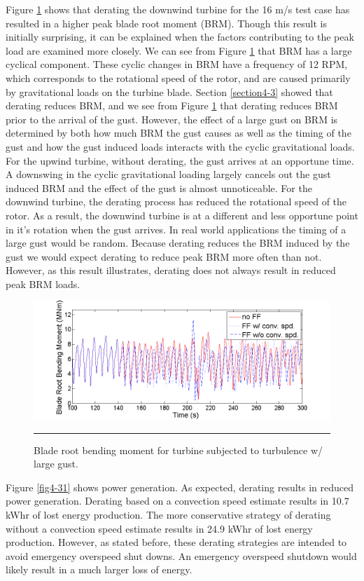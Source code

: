 Figure \ref{fig4-30} shows that derating the downwind turbine for the 16 m/s test case has resulted in a higher peak blade root moment (BRM). Though this result is initially surprising, it can be explained when the factors contributing to the peak load are examined more closely. We can see from Figure \ref{fig4-30} that BRM has a large cyclical component. These cyclic changes in BRM have a frequency of 12 RPM, which corresponds to the rotational speed of the rotor, and are caused primarily by gravitational loads on the turbine blade. Section \ref{section4-3} showed that derating reduces BRM, and we see from Figure \ref{fig4-30} that derating reduces BRM prior to the arrival of the gust. However, the effect of a large gust on BRM is determined by both how much BRM the gust causes as well as the timing of the gust and how the gust induced loads interacts with the cyclic gravitational loads. For the upwind turbine, without derating, the gust arrives at an opportune time. A downswing in the cyclic gravitational loading largely cancels out the gust induced BRM and the effect of the gust is almost unnoticeable. For the downwind turbine, the derating process has reduced the rotational speed of the rotor. As a result, the downwind turbine is at a different and less opportune point in it's rotation when the gust arrives. In real world applications the timing of a large gust would be random. Because derating reduces the BRM induced by the gust we would expect derating to reduce peak BRM more often than not. However, as this result illustrates, derating does not always result in reduced peak BRM loads.

\begin{figure}[htbp]
	\centering
		\includegraphics[trim = {1cm 0 2cm 0}, clip, width = \linewidth]{Figures/ch4Figures/fig4-30.png}
		\rule{35em}{0.5pt}
	\caption{Blade root bending moment for turbine subjected to turbulence w/ large gust.}
	\label{fig4-30}
\end{figure}

Figure \ref{fig4-31} shows power generation. As expected, derating results in reduced power generation. Derating based on a convection speed estimate results in 10.7 kWhr of lost energy production. The more conservative strategy of derating without a convection speed estimate results in 24.9 kWhr of lost energy production. However, as stated before, these derating strategies are intended to avoid emergency overspeed shut downs. An emergency overspeed shutdown would likely result in a much larger loss of energy.

